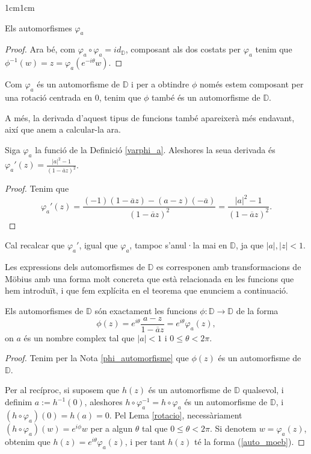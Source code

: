 \begin{adjustwidth}{1cm}{1cm}
\begin{subsection}{Els automorfismes \texorpdfstring{$\varphi_a$}{C}}
\begin{proof}
    Ara bé, com $\varphi_a\circ\varphi_a=id_{\mathbb{D}}$, composant als dos costats per $\varphi_a$ tenim que $\phi^{-1}(w)=z=\varphi_a(e^{-i\theta}w)$.
\end{proof}

\begin{nota}
    Com $\varphi_a$ és un automorfisme de $\mathbb{D}$ i per a obtindre $\phi$ només estem composant per una rotació centrada en $0$, tenim que $\phi$ també és un automorfisme de $\mathbb{D}$.
    \label{phi_automorfisme}
\end{nota}

A més, la derivada d'aquest tipus de funcions també apareixerà més endavant, així que anem a calcular-la ara.

\begin{lema}
    Siga $\varphi_a$ la funció de la Definició \ref{varphi_a}. Aleshores la seua derivada és $\varphi_a'(z)=\frac{|a|^2-1}{(1-\overline{a}z)^2}$.
    \label{varphi_a_derivada}
\end{lema}

\begin{proof}
    Tenim que 
\[
    \varphi_a'(z)=\frac{(-1)(1-\overline{a}z)-(a-z)(-\overline{a})}{(1-\overline{a}z)^2}=\frac{|a|^2-1}{(1-\overline{a}z)^2}.
\]
\end{proof}


Cal recalcar que $\varphi_a'$, igual que $\varphi_a$, tampoc s'anul·la mai en $\mathbb{D}$, ja que $|a|,|z|<1$.

Les expressions dels automorfismes de $\mathbb{D}$ es corresponen amb transformacions de Möbius amb una forma molt concreta que està relacionada en les funcions que hem introduït, i que fem explícita en el teorema que enunciem a continuació.

\begin{teorema}
    Els automorfismes de $\mathbb{D}$ són exactament les  funcions $\phi:\mathbb{D}\to \mathbb{D}$ de la forma 
    \begin{equation}
        \phi(z)=e^{i\theta}\frac{a-z}{1-\overline{a}z}=e^{i\theta}\varphi_a(z),
        \label{auto_moeb}
    \end{equation}
    on $a$ és un nombre complex tal que $|a|<1$ i $0\leq\theta< 2\pi$.
    \label{forma_aut_D}
\end{teorema}

\begin{proof}
    Tenim per la Nota \ref{phi_automorfisme} que $\phi(z)$ és un automorfisme de $\mathbb{D}$. 

    Per al recíproc, si suposem que $h(z)$ és un automorfisme de $\mathbb{D}$ qualsevol, i definim $a:=h^{-1}(0)$, aleshores $h \circ \varphi_a^{-1}=h\circ\varphi_a$ és un automorfisme de $\mathbb{D}$, i $(h\circ \varphi_a)(0)=h(a)=0$. Pel Lema \ref{rotacio}, necessàriament $(h\circ \varphi_a)(w)=e^{i\phi}w$ per a algun $\theta$ tal que $0\leq\theta<2\pi$. Si denotem $w=\varphi_a(z)$, obtenim que $h(z)=e^{i\theta}\varphi_a(z)$, i per tant $h(z)$ té la forma (\ref{auto_moeb}).


\end{proof}
\end{subsection}
\end{adjustwidth}

